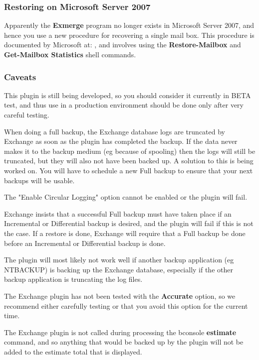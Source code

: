 \subsubsection{Restoring on Microsoft Server 2007}
Apparently the {\bf Exmerge} program no longer exists in Microsoft Server
2007, and hence you use a new procedure for recovering a single mail box.
This procedure is documented by Microsoft at:
,
and involves using the {\bf Restore-Mailbox} and {\bf
Get-Mailbox Statistics} shell commands.

\subsubsection{Caveats}
This plugin is still being developed, so you should consider it
currently in BETA test, and thus use in a production environment
should be done only after very careful testing.

When doing a full backup, the Exchange database logs are truncated by
Exchange as soon as the plugin has completed the backup. If the data
never makes it to the backup medium (eg because of spooling) then the
logs will still be truncated, but they will also not have been backed
up. A solution to this is being worked on. You will have to schedule a
new Full backup to ensure that your next backups will be usable.

The "Enable Circular Logging" option cannot be enabled or the plugin
will fail.

Exchange insists that a successful Full backup must have taken place if
an Incremental or Differential backup is desired, and the plugin will
fail if this is not the case. If a restore is done, Exchange will
require that a Full backup be done before an Incremental or Differential
backup is done.

The plugin will most likely not work well if another backup application
(eg NTBACKUP) is backing up the Exchange database, especially if the
other backup application is truncating the log files.

The Exchange plugin has not been tested with the {\bf Accurate} option, so
we recommend either carefully testing or that you avoid this option for
the current time.

The Exchange plugin is not called during processing the bconsole {\bf
estimate} command, and so anything that would be backed up by the plugin
will not be added to the estimate total that is displayed.


